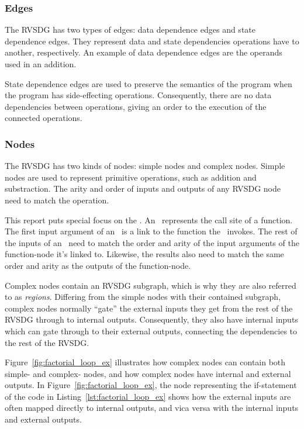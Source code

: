 \subsubsection{Edges}

The RVSDG has two types of edges: data dependence edges and state dependence
edges. They represent data and state dependencies operations have to another,
respectively. An example of data dependence edges are the operands used in an
addition.

State dependence edges are used to preserve the semantics of the program when
the program has side-effecting operations. Consequently, there are no data
dependencies between operations, giving an order to the execution of the
connected operations.

\subsubsection{Nodes}

The RVSDG has two kinds of nodes: simple nodes and complex nodes. Simple nodes
are used to represent primitive operations, such as addition and substraction.
The arity and order of inputs and outputs of any RVSDG node need to match the
operation.

This report puts special focus on the \applyNode . An \applyNode~represents the
call site of a function. The first input argument of an \applyNode~is a link to
the function the \applyNode~invokes. The rest of the inputs of an
\applyNode~need to match the order and arity of the input arguments of the
function-node it's linked to. Likewise, the results also need to match the same
order and arity as the outputs of the function-node.

Complex nodes contain an RVSDG subgraph, which is why they are also referred to
as \textit{regions}. Differing from the simple nodes with their contained
subgraph, complex nodes normally ``gate'' the external inputs they get from the
rest of the RVSDG through to internal outputs. Consequently, they also have
internal inputs which can gate through to their external outputs, connecting the
dependencies to the rest of the RVSDG.

Figure~\ref{fig:factorial_loop_ex} illustrates how complex nodes can contain
both simple- and complex- nodes, and how complex nodes have internal and
external outputs. In Figure~\ref{fig:factorial_loop_ex}, the node representing
the if-statement of the code in Listing~\ref{lst:factorial_loop_ex} shows how
the external inputs are often mapped directly to internal outputs, and vica
versa with the internal inputs and external outputs.

